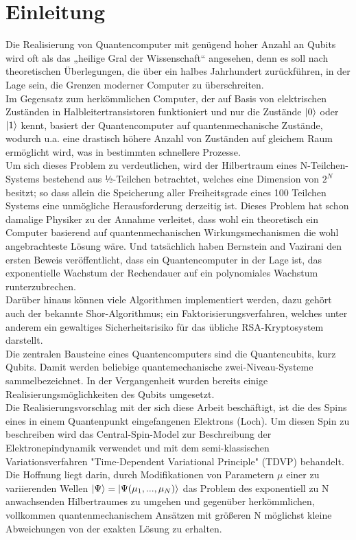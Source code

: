 \chapter{Einleitung}
Die Realisierung von Quantencomputer mit genügend hoher Anzahl an Qubits wird oft als das „heilige Gral der Wissenschaft“ angesehen, denn 
es soll nach theoretischen Überlegungen, die über ein halbes Jahrhundert zurückführen, in der Lage sein, die Grenzen moderner Computer zu 
überschreiten. \\Im Gegensatz zum herkömmlichen Computer, der auf Basis von elektrischen Zuständen in Halbleitertransistoren funktioniert 
und nur die Zustände $\ket{0}$ oder $\ket{1}$ kennt, basiert der Quantencomputer auf quantenmechanische Zustände, wodurch u.a. eine 
drastisch höhere Anzahl von Zuständen auf gleichem Raum ermöglicht wird, was in bestimmten schnellere Prozesse.\\
Um sich dieses Problem zu verdeutlichen, wird der Hilbertraum eines N-Teilchen-Systems bestehend aus ½-Teilchen betrachtet, welches eine 
Dimension von $2^N$ besitzt; so dass allein die Speicherung aller Freiheitsgrade eines 100 Teilchen Systems eine unmögliche Herausforderung
 derzeitig ist. Dieses Problem hat schon damalige Physiker zu der Annahme verleitet, dass wohl ein theoretisch ein Computer basierend 
 auf quantenmechanischen Wirkungsmechanismen die wohl angebrachteste Lösung wäre. Und tatsächlich haben Bernstein and Vazirani 
 den ersten Beweis veröffentlicht, dass ein Quantencomputer in der Lage ist, das exponentielle Wachstum der Rechendauer auf ein 
 polynomiales Wachstum runterzubrechen.\\
Darüber hinaus können viele Algorithmen implementiert werden, dazu gehört auch der bekannte Shor-Algorithmus; ein Faktorisierungsverfahren,
welches unter anderem ein gewaltiges Sicherheitsrisiko für das übliche RSA-Kryptosystem darstellt.\\

\noindent Die zentralen Bausteine eines Quantencomputers sind die Quantencubits, kurz Qubits. Damit werden beliebige quantemechanische 
zwei-Niveau-Systeme sammelbezeichnet. In der Vergangenheit wurden bereits einige Realisierungsmöglichkeiten des Qubits umgesetzt.\\
Die Realisierungsvorschlag mit der sich diese Arbeit beschäftigt, ist die des Spins eines in einem Quantenpunkt eingefangenen 
Elektrons (Loch). Um diesen Spin zu beschreiben wird das Central-Spin-Model zur Beschreibung der Elektronepindynamik verwendet und mit 
dem semi-klassischen Variationsverfahren "Time-Dependent Variational Principle" (TDVP) behandelt.\\

\noindent Die Hoffnung liegt darin, durch Modifikationen von Parametern $\mu$ einer zu variierenden Wellen 
$\ket{\Psi} = \ket{\Psi(\mu_1,...,\mu_N)}$ das Problem des exponentiell zu N anwachsenden Hilbertraumes zu umgehen und gegenüber 
herkömmlichen, vollkommen quantenmechanischem Ansätzen mit größeren N möglichst kleine Abweichungen von der exakten Lösung zu erhalten.
